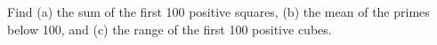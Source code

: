 Find (a) the sum of the first 100 positive squares, (b) the mean of the primes below 100, and (c) the range of the first 100 positive cubes.
